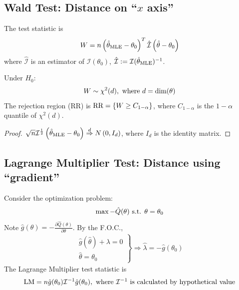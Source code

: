 \documentclass[11pt]{elegantbook}
\begin{document}
\subsection{Wald Test: Distance on ``$x$ axis''}
The test statistic is
\begin{equation}
    \begin{aligned}
        W=n \left(\hat{\theta}_\textnormal{MLE}-\theta_0\right)^T \hat{\mathcal{I}} \left(\hat{\theta}-\theta_0\right)
    \end{aligned}
    \nonumber
\end{equation}
where $\hat{\mathcal{I}}$ is an estimator of $\mathcal{I}(\theta_0)$, $\hat{\mathcal{I}}:=\mathcal{I}(\hat{\theta}_\textnormal{MLE})^{-1}$.

Under $H_0$:
\begin{equation}
    \begin{aligned}
        W\sim \chi^2(d), \textnormal{ where }d=\textnormal{dim}(\theta)
    \end{aligned}
    \nonumber
\end{equation}
The rejection region (RR) is $\textnormal{RR}=\{W\geq C_{1-\alpha}\}$, where $C_{1-\alpha}$ is the $1-\alpha$ quantile of $\chi^2(d)$.

\begin{proof}
    $\sqrt{n}\mathcal{I}^{\frac{1}{2}}\left(\hat{\theta}_\textnormal{MLE}-\theta_0\right) \stackrel{d}{\Rightarrow} N\left(0,I_d\right)$, where $I_d$ is the identity matrix.
\end{proof}


\subsection{Lagrange Multiplier Test: Distance using ``gradient''}
Consider the optimization problem:
\begin{equation}
    \begin{aligned}
        \max -\hat{Q}(\theta) \textnormal{ s.t. } \theta=\theta_0
    \end{aligned}
    \nonumber
\end{equation}
Note $\hat{g}(\theta)=-\frac{\partial \hat{Q}(\theta)}{\partial \theta}$. By the F.O.C.,
\begin{equation}
    \begin{aligned}
        \left.\begin{matrix}
            \hat{g}(\hat{\theta})+\lambda=0\\
        \hat{\theta}=\theta_0
        \end{matrix}\right\} \Rightarrow \hat{\lambda}=-\hat{g}(\theta_0)
    \end{aligned}
    \nonumber
\end{equation}
The Lagrange Multiplier test statistic is
\begin{equation}
    \begin{aligned}
        \textnormal{LM}=n \hat{g}(\theta_0) \mathcal{I}^{-1} \hat{g}(\theta_0), \textnormal{ where $\mathcal{I}^{-1}$ is calculated by hypothetical value}
    \end{aligned}
    \nonumber
\end{equation}
\end{document}
